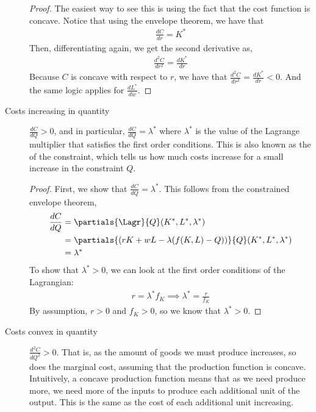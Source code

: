 \begin{description}
    \begin{proof}
        The easiest way to see this is using the fact that the cost function is concave. Notice that using the envelope theorem, we have that
        \begin{align*}
            \frac{dC}{dr} = K^*
        \end{align*}
        Then, differentiating again, we get the second derivative as,
        \begin{align*}
            \frac{d^2C}{dr^2} = \frac{dK^*}{dr}
        \end{align*}
        Because $C$ is concave with respect to $r$, we have that $\frac{d^2C}{dr^2} = \frac{dK^*}{dr} < 0$. And the same logic applies for $\frac{dL^*}{dw}$. 
    \end{proof}

    \item[Costs increasing in quantity] $\frac{dC}{dQ} > 0$, and in particular, $\frac{dC}{dQ} = \lambda^*$ where $\lambda^*$ is the value of the Lagrange multiplier that satisfies the first order conditions. This is also known as the  of the constraint, which tells us how much costs increase for a small increase in the constraint $Q$. 
    \begin{proof}
        First, we show that $\frac{dC}{dQ} = \lambda^*$. This follows from the constrained envelope theorem,
        \begin{align*}
            \frac{dC}{dQ} &= \partials{\Lagr}{Q}(K^*, L^*, \lambda^*)\\
            &= \partials{(rK + wL - \lambda(f(K, L) - Q))}{Q}(K^*, L^*, \lambda^*) \\
            &= \lambda^*
        \end{align*}
        To show that $\lambda^* > 0$, we can look at the first order conditions of the Lagrangian:
        \begin{align*}
            r = \lambda^* f_K \implies \lambda^* = \frac{r}{f_K}
        \end{align*}
        By assumption, $r > 0$ and $f_K > 0$, so we know that $\lambda^* > 0$. 
    \end{proof} 

    \item[Costs convex in quantity] $\frac{d^2C}{dQ^2} > 0$. That is, as the amount of goods we must produce increases, so does the marginal cost, assuming that the production function is concave. Intuitively, a concave production function means that as we need produce more, we need more of the inputs to produce each additional unit of the output. This is the same as the cost of each additional unit increasing.
    

\end{description}
